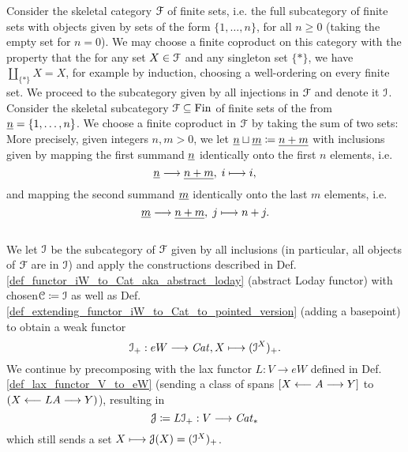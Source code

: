   \begin{defn}\label{def_J_and_functors_from_finite_sets_to_pointed_categories}
    Consider the skeletal category $\mathcal{F}$ of finite sets, i.e. the full subcategory of finite sets with objects given by sets of the form $\{1, \ldots, n\}$, for all $n \geq 0$ (taking the empty set for $n=0$). We may choose a finite coproduct on this category with the property that the for any set $X \in \mathcal{F}$ and any singleton set $\{*\}$, we have $\coprod_{\{*\}} X = X$, for example by induction, choosing a well-ordering on every finite set. We proceed to the subcategory given by all injections in $\mathcal{F}$ and denote it $\mathcal{I}$.
    Consider the skeletal subcategory $\mathcal{F} \subseteq \mathrm{Fin}$ of finite sets of the from $\underline{n} = \{ 1, \ldots , n\}$. We choose a finite coproduct in $\mathcal{F}$ by taking the sum of two sets: More precisely, given integers $n,m > 0$, we let $\underline{n} \sqcup \underline{m} \coloneqq \underline{n+m}$ with inclusions given by mapping the first summand $\underline{n}$ identically onto the first $n$ elements, i.e. 
    \begin{displaymath}
      \underline{n} \longrightarrow \underline{n+m},\; i \longmapsto i,
    \end{displaymath}
    and mapping the second summand $\underline{m}$ identically onto the last $m$ elements, i.e.
    \begin{displaymath}
      \underline{m} \longrightarrow \underline{n+m},\; j \longmapsto n+j.
    \end{displaymath}
    \\
    We let $\mathcal{I}$ be the subcategory of $\mathcal{F}$ given by all inclusions (in particular, all objects of $\mathcal{F}$ are in $\mathcal{I}$) and apply the constructions described in Def. \ref{def_functor_iW_to_Cat_aka_abstract_loday} (abstract Loday functor) with  chosen$\mathcal{C} \coloneqq \mathcal{I}$ as well as Def. \ref{def_extending_functor_iW_to_Cat_to_pointed_version} (adding a basepoint) to obtain a weak functor 
    \begin{displaymath}
      \mathcal{I}_+: eW \longrightarrow \mathit{Cat}, X \longmapsto (\mathcal{I}^X)_+.
    \end{displaymath}
    We continue by precomposing with the lax functor $L: V \to eW$ defined in Def. \ref{def_lax_functor_V_to_eW} (sending a class of spans $[X \longleftarrow A \longrightarrow Y]$ to $(X \longleftarrow LA \longrightarrow Y)$), resulting in 
    \begin{displaymath}
      \mathcal{J} \coloneqq L \mathcal{I}_+: V \longrightarrow \mathit{Cat}_*
    \end{displaymath}
    which still sends a set $X \longmapsto \mathcal{J}(X) = (\mathcal{I}^X)_+$.\\

\end{defn}
